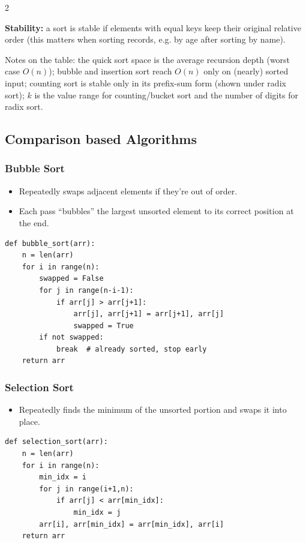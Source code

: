 \documentclass[9pt,a4paper]{extarticle}
\begin{document}
\begin{multicols}{2}

\textbf{Stability:} a sort is stable if elements with equal keys keep their original relative order (this matters when sorting records, e.g. by age after sorting by name).


Notes on the table: the quick sort space is the average recursion depth (worst case $O(n)$); bubble and insertion sort reach $O(n)$ only on (nearly) sorted input; counting sort is stable only in its prefix-sum form (shown under radix sort); $k$ is the value range for counting/bucket sort and the number of digits for radix sort.


\subsection{Comparison based Algorithms}

\subsubsection{Bubble Sort}

\begin{itemize}
\item Repeatedly swaps adjacent elements if they're out of order.
\item Each pass “bubbles” the largest unsorted element to its correct position at the end.
\end{itemize}

\begin{lstlisting}
def bubble_sort(arr):
    n = len(arr)
    for i in range(n):
        swapped = False
        for j in range(n-i-1):
            if arr[j] > arr[j+1]:
                arr[j], arr[j+1] = arr[j+1], arr[j]
                swapped = True
        if not swapped:
            break  # already sorted, stop early
    return arr
\end{lstlisting}

\subsubsection{Selection Sort}

\begin{itemize}
\item Repeatedly finds the minimum of the unsorted portion and swaps it into place.
\end{itemize}

\begin{lstlisting}
def selection_sort(arr):
    n = len(arr)
    for i in range(n):
        min_idx = i
        for j in range(i+1,n):
            if arr[j] < arr[min_idx]:
                min_idx = j
        arr[i], arr[min_idx] = arr[min_idx], arr[i]
    return arr
\end{lstlisting}


\end{multicols}
\end{document}
